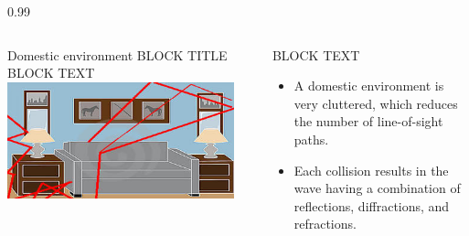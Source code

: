 \documentclass[final]{beamer}
\theoremstyle{plain}
\theoremstyle{definition}
\theoremstyle{remark}
\newlength{\twocolwid}
\begin{document}
\begin{frame}[t]
\begin{columns}[t]
\begin{column}{0.99\twocolwid}
\begin{columns}
\begin{column}{0.45\linewidth}
\begin{block}{Domestic environment BLOCK TITLE}
\vspace{-1cm}
BLOCK TEXT
\includegraphics[scale=5.2]{livingroom.jpg} 
\end{block}
\end{column}

\begin{column}{0.01\linewidth}
\end{column}

\begin{column}{0.45\linewidth}
\vspace{-1.25cm}
\begin{mdframed}[backgroundcolor=white, userdefinedwidth=0.999999\linewidth]
\vspace{0.5cm}
BLOCK TEXT
\begin{itemize}
\item A domestic environment is very cluttered, which reduces the number of line-of-sight paths.
\item Each collision results in the wave having a combination of reflections, diffractions, and refractions. 
\end{itemize}
\vspace{0.5cm}
\end{mdframed}

\end{column}
\end{columns}


\end{column}
\end{columns}
\end{frame}
\end{document}
